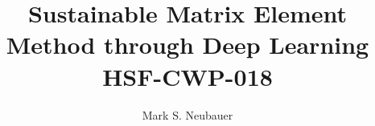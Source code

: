 \usepackage[utf8]{inputenc}
\usepackage[USenglish]{babel}
\usepackage{enumitem}
\usepackage{tikz}
\usepackage{verbatim}
\usepackage{authblk}

\usepackage[a4paper,margin=2cm]{geometry}%

\usepackage{fancyhdr}
\pagestyle{fancy}
\fancyhf{}
\chead{}
\cfoot{\thepage}
\renewcommand{\headrulewidth}{1.0pt}

\title{Sustainable Matrix Element Method through Deep Learning \\ 
\vspace{2mm} 
\large HSF-CWP-018 \\
}

\author[1]{Mark S. Neubauer}

\renewcommand\Authands{ and }




\usepackage{hyperref}
\hypersetup{
  colorlinks=true,       %
  linkcolor=black,          %
  citecolor=green,        %
  filecolor=magenta,      %
  urlcolor=blue           %
}

\usepackage{amssymb}%
\usepackage{amsmath}
\usepackage{pifont}%
\providecommand{\xmark}{\ding{55}}%

\usepackage[backend=biber,defernumbers=true,sorting=none,firstinits=true,natbib=true,style=numeric-comp]{biblatex}



